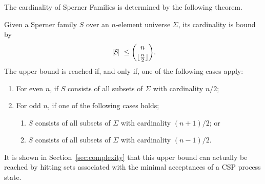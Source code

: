 The cardinality of Sperner Families is determined by the following theorem.
\begin{theorem}
\label{th:sperner}
Given a  Sperner family $S$
over an $n$-element universe $\Sigma$, its cardinality is bound by
\[
{~|\! S\!|~} \le \binom{n}{\lfloor\frac{n}{2}\rfloor}.
\]
The upper bound is reached if, and only if, one of the following cases apply:
\begin{enumerate}
\item For even $n$, if $S$ consists of all subsets of $\Sigma$ with
    cardinality $n/2$;
\item For odd $n$, if one of the following cases holds;
\begin{enumerate}
\item $S$ consists of all subsets of $\Sigma$ with cardinality $(n+1)/2$;
    or
\item $S$ consists of all subsets of $\Sigma$ with cardinality $(n-1)/2$.
\end{enumerate}
\end{enumerate}
\xbox
\end{theorem}
It is shown in Section~\ref{sec:complexity} that this upper bound can
actually be reached by hitting sets associated with the minimal acceptances
of a CSP process state.
